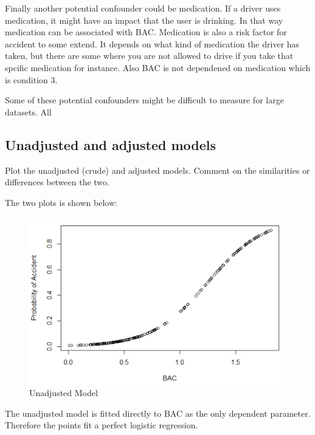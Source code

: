 Finally another potential confounder could be medication. If a driver uses medication, it might have an impact that the user is drinking. In that way medication can be associated with BAC. Medication is also a risk factor for accident to some extend. It depends on what kind of medication the driver has taken, but there are some where you are not allowed to drive if you take that spcific medication for instance. Also BAC is not dependened on medication which is condition 3. 

Some of these potential confounders might be difficult to measure for large datasets.
All 

\subsection{Unadjusted and adjusted models}

Plot the unadjusted (crude) and adjusted models. 
Comment on the similarities or differences between the
two.

The two plots is shown below:

\begin{figure}[H]
    \centering
    \includegraphics[scale=0.5]{unadjusted.PNG}
    \caption{Unadjusted Model}
    \label{fig:unadjusted}
\end{figure}

The unadjusted model is fitted directly to BAC as the only dependent parameter. Therefore the points fit a perfect logistic regression.

